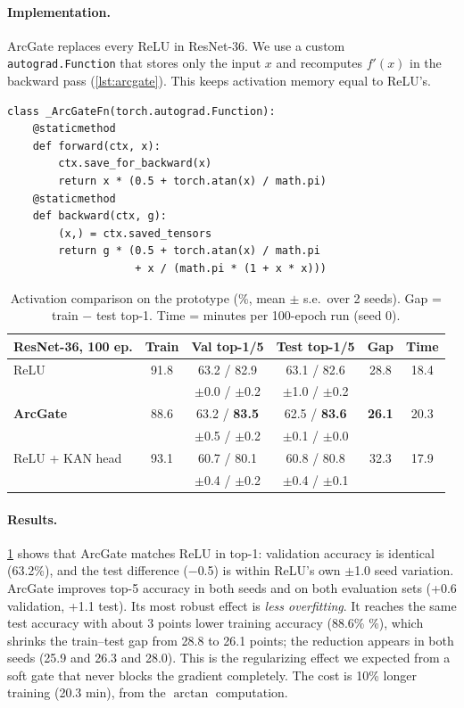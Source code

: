 \documentclass[10pt,twocolumn,letterpaper]{article}
\begin{document}
\paragraph{Implementation.}
ArcGate replaces every ReLU in ResNet-36. We use a custom \texttt{autograd.Function} that stores only the input $x$ and recomputes $f'(x)$ in the backward pass (\cref{lst:arcgate}). This keeps activation memory equal to ReLU's.

\begin{lstlisting}[float=tbp,caption={ArcGate with a hand-written backward pass.},label={lst:arcgate}]
class _ArcGateFn(torch.autograd.Function):
    @staticmethod
    def forward(ctx, x):
        ctx.save_for_backward(x)
        return x * (0.5 + torch.atan(x) / math.pi)
    @staticmethod
    def backward(ctx, g):
        (x,) = ctx.saved_tensors
        return g * (0.5 + torch.atan(x) / math.pi
                    + x / (math.pi * (1 + x * x)))
\end{lstlisting}

\begin{table}[t]
\centering\footnotesize\setlength{\tabcolsep}{2.5pt}
\begin{tabular}{@{}lccccc@{}}
\toprule
ResNet-36, 100 ep. & Train & Val top-1/5 & Test top-1/5 & Gap & Time \\
\midrule
ReLU & 91.8 & 63.2 / 82.9 & 63.1 / 82.6 & 28.8 & 18.4 \\
 & & {\tiny$\pm$0.0 / $\pm$0.2} & {\tiny$\pm$1.0 / $\pm$0.2} & & \\
\textbf{ArcGate} & 88.6 & 63.2 / \textbf{83.5} & 62.5 / \textbf{83.6} & \textbf{26.1} & 20.3 \\
 & & {\tiny$\pm$0.5 / $\pm$0.2} & {\tiny$\pm$0.1 / $\pm$0.0} & & \\
ReLU + KAN head & 93.1 & 60.7 / 80.1 & 60.8 / 80.8 & 32.3 & 17.9 \\
 & & {\tiny$\pm$0.4 / $\pm$0.2} & {\tiny$\pm$0.4 / $\pm$0.1} & & \\
\bottomrule
\end{tabular}
\caption{Activation comparison on the prototype (\%, mean $\pm$ s.e.\ over 2 seeds). Gap = train $-$ test top-1. Time = minutes per 100-epoch run (seed 0).}
\label{tab:act}
\end{table}

\paragraph{Results.}
\cref{tab:act} shows that ArcGate matches ReLU in top-1: validation accuracy is identical (63.2\%), and the test difference ($-$0.5) is within ReLU's own $\pm$1.0 seed variation. ArcGate improves top-5 accuracy in both seeds and on both evaluation sets (+0.6 validation, +1.1 test). Its most robust effect is \emph{less overfitting}. It reaches the same test accuracy with about 3 points lower training accuracy (88.6\% \%), which shrinks the train--test gap from 28.8 to 26.1 points; the reduction appears in both seeds (25.9 and 26.3  and 28.0). This is the regularizing effect we expected from a soft gate that never blocks the gradient completely. The cost is 10\% longer training (20.3  min), from the $\arctan$ computation.
\end{document}

